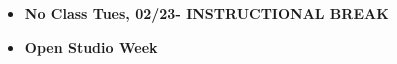 \def\dMon{Mon, 02/22}
\def\dTues{Tues, 02/23}
\def\dWed{Wed, 02/24}
\def\dThur{Thur, 02/25}
\def\dFri{Fri, 02/26}
\def\dSat{Sat, 02/27}
\def\dSun{Sun, 02/28}
\placeDate

\begin{itemize}[noitemsep,topsep=0pt,leftmargin=*]
    \item \textcolor{defaultColor}{\textbf{No Class \dTues - INSTRUCTIONAL BREAK}}
    \item \textcolor{defaultColor}{\textbf{Open Studio Week}}
\end{itemize}

